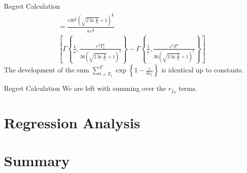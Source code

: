 \documentclass{beamer}
\begin{document}
\begin{frame}{Regret Calculation}
\begin{eqnarray}
&&=\frac{e36^{\frac{1}{\kappa}}\left(\sqrt{2\ln{\frac{2}{\delta_t}}}+1\right)^{\frac{2}{\kappa}}}{\kappa\varepsilon^{\frac{2}{\kappa}}}\nonumber\\
&&\left[\Gamma\left\{\frac{1}{\kappa},\frac{\varepsilon^2T_{1}^{\kappa}}{36\left(\sqrt{2\ln{\frac{2}{\delta_t}}}+1\right)^2}\right\}-\Gamma\left\{\frac{1}{\kappa},\frac{\varepsilon^2T^{\kappa}}{36\left(\sqrt{2\ln{\frac{2}{\delta_t}}}+1\right)^2}\right\}\right]\nonumber
\end{eqnarray}
\newline\newline
The development of the sum $\sum\limits_{t=T_1}^{T}\exp\left\{1-\frac{\varepsilon}{6r_t}\right\}$ is identical up to constants.
\end{frame}

\begin{frame}{Regret Calculation}
We are left with summing over the $r_{L_t}$ terms.


\end{frame}
\section{Regression Analysis}

\section{Summary}
\end{document}
